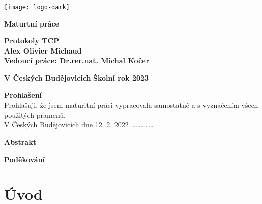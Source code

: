 \documentclass[12pt]{article}
\begin{document}
\begin{center}
\hspace{-2cm}
\texttt{[image: logo-dark]}


\vspace{4cm}


\hspace{-2.2cm}
\huge\textbf{Maturtní práce}

\vspace{1.5cm}
\hspace{-2cm}
\huge\textbf{Protokoly TCP}
\vspace{0.75cm}
\\
\hspace{-2cm}
\huge\textbf{Alex Olivier Michaud}
\\
\hspace{-2cm}
\vspace{0.75cm}
\large\textbf{Vedoucí práce: Dr.rer.nat. Michal Kočer}
\end{center}

\vspace{6cm}

\rightline\Huge\textbf{V Českých Budějovicích}
\hspace{4cm}
\Large\textbf{Školní rok 2023 } 		



\thispagestyle{empty}
\clearpage
\Large\textbf{Prohlašení}
\\
\vspace{2cm}
Prohlašuji, že jsem maturitní práci vypracovala samostatně a s vyznačením všech 
použitých pramenů.
\\
\vspace{5cm}
V Českých Budějovicích dne 12. 2. 2022 ……………
\thispagestyle{empty}


\clearpage
\Large\textbf{Abstrakt}

\thispagestyle{empty}
\clearpage
\Large\textbf{Poděkování}

\thispagestyle{empty}


\clearpage
\tableofcontents
\thispagestyle{empty}
\clearpage
\section{Úvod}
\setlength{\parindent}{14.17pt}
\end{document}
